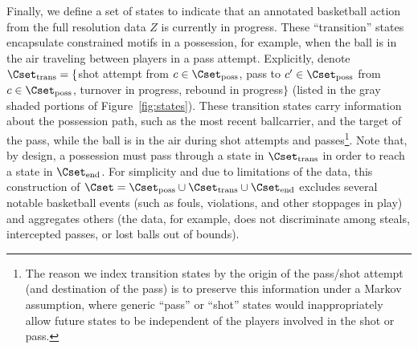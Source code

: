 \documentclass[EPV_JASA.tex]{subfiles}
\begin{document}
Finally, we define a set of states to indicate that an annotated basketball action from the full resolution data $Z$ is currently in progress. These ``transition'' states encapsulate constrained motifs in a possession, for example, when the ball is in the air traveling between players in a pass attempt. Explicitly, denote $\Cset_{\text{trans}} = \{$shot attempt from $c \in \Cset_{\text{poss}}$, pass to $c' \in \Cset_{\text{poss}}$ from $c \in \Cset_{\text{poss}}$, turnover in progress, rebound in progress$\}$ (listed in the gray shaded portions of Figure~\ref{fig:states}). These transition states carry information about the possession path, such as the most recent ballcarrier, and the target of the pass, while the ball is in the air during shot attempts and passes\footnote{The reason we index transition states by the origin of the pass/shot attempt (and destination of the pass) is to preserve this information under a Markov assumption, where generic ``pass'' or ``shot'' states would inappropriately allow future states to be independent of the players involved in the shot or pass.}. Note that, by design, a possession must pass through a state in $\Cset_{\text{trans}}$ in order to reach a state in $\Cset_{\text{end}}$. For simplicity and due to limitations of the data, this construction of $\Cset = \Cset_{\text{poss}} \cup \Cset_{\text{trans}} \cup \Cset_{\text{end}}$ excludes several notable basketball events (such as fouls, violations, and other stoppages in play) and aggregates others (the data, for example, does not discriminate among steals, intercepted passes, or lost balls out of bounds).%


\end{document}
